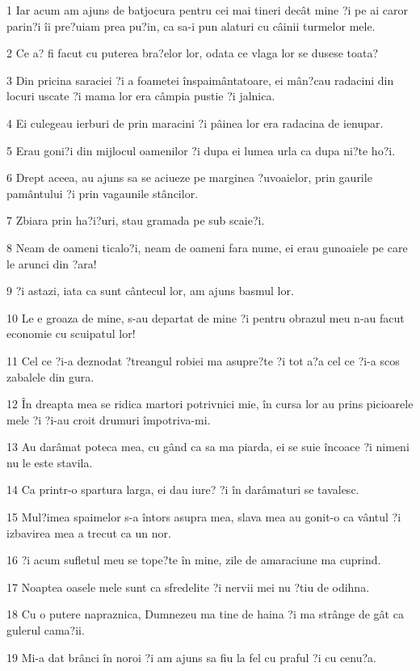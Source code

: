 \par 1 Iar acum am ajuns de batjocura pentru cei mai tineri decât mine ?i pe ai caror parin?i îi pre?uiam prea pu?in, ca sa-i pun alaturi cu câinii turmelor mele.
\par 2 Ce a? fi facut cu puterea bra?elor lor, odata ce vlaga lor se dusese toata?
\par 3 Din pricina saraciei ?i a foametei înspaimântatoare, ei mân?cau radacini din locuri uscate ?i mama lor era câmpia pustie ?i jalnica.
\par 4 Ei culegeau ierburi de prin maracini ?i pâinea lor era radacina de ienupar.
\par 5 Erau goni?i din mijlocul oamenilor ?i dupa ei lumea urla ca dupa ni?te ho?i.
\par 6 Drept aceea, au ajuns sa se aciueze pe marginea ?uvoaielor, prin gaurile pamântului ?i prin vagaunile stâncilor.
\par 7 Zbiara prin ha?i?uri, stau gramada pe sub scaie?i.
\par 8 Neam de oameni ticalo?i, neam de oameni fara nume, ei erau gunoaiele pe care le arunci din ?ara!
\par 9 ?i astazi, iata ca sunt cântecul lor, am ajuns basmul lor.
\par 10 Le e groaza de mine, s-au departat de mine ?i pentru obrazul meu n-au facut economie cu scuipatul lor!
\par 11 Cel ce ?i-a deznodat ?treangul robiei ma asupre?te ?i tot a?a cel ce ?i-a scos zabalele din gura.
\par 12 În dreapta mea se ridica martori potrivnici mie, în cursa lor au prins picioarele mele ?i ?i-au croit drumuri împotriva-mi.
\par 13 Au darâmat poteca mea, cu gând ca sa ma piarda, ei se suie încoace ?i nimeni nu le este stavila.
\par 14 Ca printr-o spartura larga, ei dau iure? ?i în darâmaturi se tavalesc.
\par 15 Mul?imea spaimelor s-a întors asupra mea, slava mea au gonit-o ca vântul ?i izbavirea mea a trecut ca un nor.
\par 16 ?i acum sufletul meu se tope?te în mine, zile de amaraciune ma cuprind.
\par 17 Noaptea oasele mele sunt ca sfredelite ?i nervii mei nu ?tiu de odihna.
\par 18 Cu o putere napraznica, Dumnezeu ma tine de haina ?i ma strânge de gât ca gulerul cama?ii.
\par 19 Mi-a dat brânci în noroi ?i am ajuns sa fiu la fel cu praful ?i cu cenu?a.
